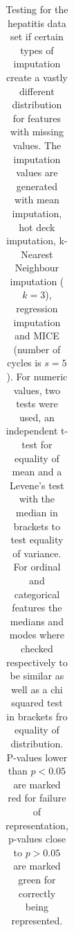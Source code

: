\documentclass[10pt,a4paper]{report}
\begin{document}
	\begin{table}
		\caption{Testing for the hepatitis data set if certain types of imputation create a vastly different distribution for features with missing values. The imputation values are generated with mean imputation, hot deck imputation, k-Nearest Neighbour imputation ($k = 3$), regression imputation and MICE (number of cycles is $s = 5$). For numeric values, two tests were used, an independent t-test for equality of mean and a Levene's test with the median in brackets to test equality of variance. For ordinal and categorical features the medians and modes where checked respectively to be similar as well as a chi squared test in brackets fro equality of distribution. P-values lower than $p < 0.05$ are marked red for failure of representation, p-values close to $p > 0.05$ are marked green for correctly being represented.}
		\label{tab:ImputationHepatitis}
		\begin{tabular}{l|lll|lll|lll|lll|lll}

\end{tabular}
\end{table}
\end{document}
